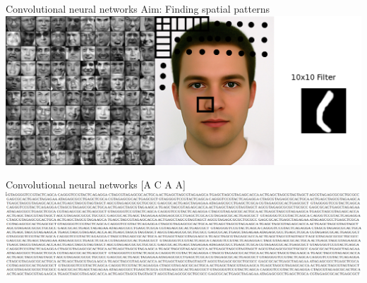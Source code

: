 \documentclass[Nike]{tuberlinbeamer}
\begin{document}


\begin{frame}{Convolutional neural networks}
  Aim: Finding spatial patterns
  \vspace{0.2cm}
  \pause
  \includegraphics[width=\linewidth]{./nosefilter.png}
\end{frame}

\begin{frame}{Convolutional neural networks}
  \huge[A C A A]
  \pause
  \vspace{0.7cm}
  \includegraphics[width=\textwidth]{./manyguides.png}
\end{frame}
\end{document}
